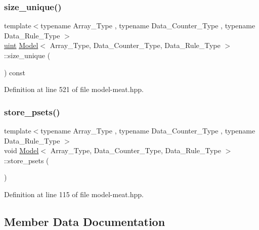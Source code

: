 \subsubsection{\texorpdfstring{size\+\_\+unique()}{size\_unique()}}
{\footnotesize\ttfamily template$<$typename Array\+\_\+\+Type , typename Data\+\_\+\+Counter\+\_\+\+Type , typename Data\+\_\+\+Rule\+\_\+\+Type $>$ \\
\hyperlink{typedefs_8hpp_a91ad9478d81a7aaf2593e8d9c3d06a14}{uint} \hyperlink{class_model}{Model}$<$ Array\+\_\+\+Type, Data\+\_\+\+Counter\+\_\+\+Type, Data\+\_\+\+Rule\+\_\+\+Type $>$\+::size\+\_\+unique (\begin{DoxyParamCaption}{ }\end{DoxyParamCaption}) const\hspace{0.3cm}{\ttfamily [inline]}}



Definition at line 521 of file model-\/meat.\+hpp.

\mbox{\label{class_model_a06a6f52dfc6868908cf11e6663a93904}} 
\subsubsection{\texorpdfstring{store\+\_\+psets()}{store\_psets()}}
{\footnotesize\ttfamily template$<$typename Array\+\_\+\+Type , typename Data\+\_\+\+Counter\+\_\+\+Type , typename Data\+\_\+\+Rule\+\_\+\+Type $>$ \\
void \hyperlink{class_model}{Model}$<$ Array\+\_\+\+Type, Data\+\_\+\+Counter\+\_\+\+Type, Data\+\_\+\+Rule\+\_\+\+Type $>$\+::store\+\_\+psets (\begin{DoxyParamCaption}{ }\end{DoxyParamCaption})\hspace{0.3cm}{\ttfamily [inline]}}



Definition at line 115 of file model-\/meat.\+hpp.



\subsection{Member Data Documentation}
\mbox{\label{class_model_a8470b5bb905b692f24a3e5197f8680ed}} 
